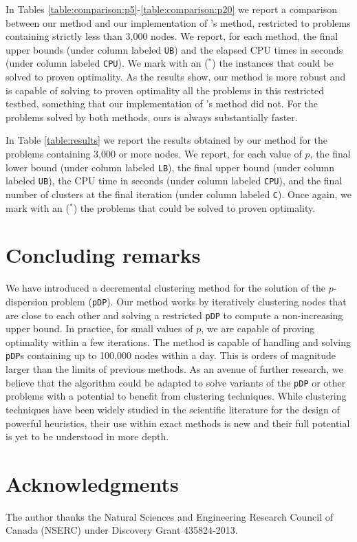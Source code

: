 \documentclass[a4paper,10pt]{article}
\newcommand{\pDP}{\texttt{pDP}}
\begin{document}
In Tables \ref{table:comparison:p5}-\ref{table:comparison:p20} we report a comparison between our method and our implementation of \citeauthor{Sayah2017new}'s method, restricted to problems containing strictly less than 3,000 nodes. We report, for each method, the final upper bounds (under column labeled \texttt{UB}) and the elapsed CPU times in seconds (under column labeled \texttt{CPU}). We mark with an ($^*$) the instances that could be solved to proven optimality. As the results show, our method is more robust and is capable of solving to proven optimality all the problems in this restricted testbed, something that our implementation of \citeauthor{Sayah2017new}'s method did not. For the problems solved by both methods, ours is always substantially faster.

In Table \ref{table:results} we report the results obtained by our method for the problems containing 3,000 or more nodes. We report, for each value of $p$, the final lower bound (under column labeled \texttt{LB}), the final upper bound (under column labeled \texttt{UB}), the CPU time in seconds (under column labeled \texttt{CPU}), and the final number of clusters at the final iteration (under column labeled \texttt{C}). Once again, we mark with an ($^*$) the problems that could be solved to proven optimality.

\section{Concluding remarks\label{section:conclusions}}

We have introduced a decremental clustering method for the solution of the $p$-dispersion problem (\pDP{}). Our method works by iteratively clustering nodes that are close to each other and solving a restricted \pDP{} to compute a non-increasing upper bound. In practice, for small values of $p$, we are capable of proving optimality within a few iterations. The method is capable of handling and solving \pDP{}s containing up to 100,000 nodes within a day. This is orders of magnitude larger than the limits of previous methods. As an avenue of further research, we believe that the algorithm could be adapted to solve variants of the \pDP{} or other problems with a potential to benefit from clustering techniques. While clustering techniques have been widely studied in the scientific literature for the design of powerful heuristics, their use within exact methods is new and their full potential is yet to be understood in more depth.

\section*{Acknowledgments}

The author thanks the Natural Sciences and Engineering Research Council of Canada (NSERC) under Discovery Grant 435824-2013.



\end{document}
